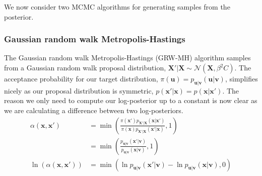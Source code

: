 \documentclass[11pt]{article}
\begin{document}
We now consider two MCMC algorithms for generating samples from the posterior.

\subsubsection{Gaussian random walk Metropolis-Hastings}
The Gaussian random walk Metropolis-Hastings (GRW-MH) algorithm samples from a Gaussian random walk proposal distribution, $\boldsymbol{X}' | \boldsymbol{X} \sim \mathcal{N}(\boldsymbol{X}, \beta^2 C)$. The acceptance probability for our target distribution, $\pi(\boldsymbol{u}) = p_{\boldsymbol{u} | \boldsymbol{v}}(\boldsymbol{u} | \boldsymbol{v})$, simplifies nicely as our proposal distribution is symmetric, $p(\boldsymbol{x}' | \boldsymbol{x}) = p(\boldsymbol{x} | \boldsymbol{x}')$. The reason we only need to compute our log-posterior up to a constant is now clear as we are calculating a difference between two log-posteriors.
\begin{equation}
    \begin{aligned}
        \alpha(\boldsymbol{x}, \boldsymbol{x}') &= \min\left(\frac{\pi(\boldsymbol{x}')p_{\boldsymbol{X}'|\boldsymbol{X}}(\boldsymbol{x}|\boldsymbol{x}')}{\pi(\boldsymbol{x})p_{\boldsymbol{X}'|\boldsymbol{X}}(\boldsymbol{x}'|\boldsymbol{x})}, 1\right) \\
          &= \min\left(\frac{p_{\boldsymbol{u} | \boldsymbol{v}}(\boldsymbol{x}' | \boldsymbol{v})}{p_{\boldsymbol{u} | \boldsymbol{v}}(\boldsymbol{x} | \boldsymbol{v})}, 1\right) \\
        \ln (\alpha(\boldsymbol{x}, \boldsymbol{x}')) &= \min(\ln p_{\boldsymbol{u} | \boldsymbol{v}}(\boldsymbol{x}' | \boldsymbol{v}) - \ln p_{\boldsymbol{u} | \boldsymbol{v}}(\boldsymbol{x} | \boldsymbol{v}), 0)
    \end{aligned}
\end{equation}
\end{document}
